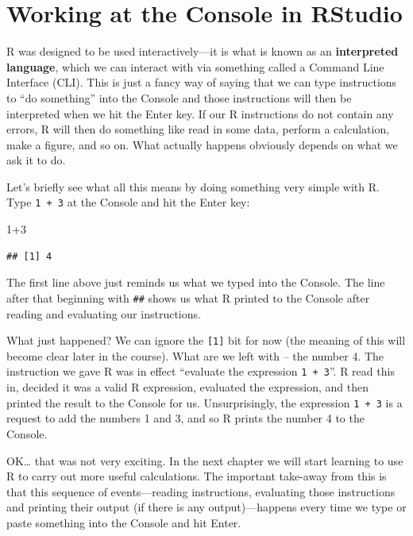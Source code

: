 \documentclass[
]{book}
\newenvironment{Shaded}{\begin{snugshade}}{\end{snugshade}}
\newcommand{\DecValTok}[1]{\textcolor[rgb]{0.00,0.00,0.81}{#1}}
\newcommand{\SpecialCharTok}[1]{\textcolor[rgb]{0.00,0.00,0.00}{#1}}
\begin{document}
\hypertarget{working-at-console}{%
\section*{Working at the Console in RStudio}\label{working-at-console}}

R was designed to be used interactively---it is what is known as an \textbf{interpreted language}, which we can interact with via something called a Command Line Interface (CLI). This is just a fancy way of saying that we can type instructions to ``do something'' into the Console and those instructions will then be interpreted when we hit the Enter key. If our R instructions do not contain any errors, R will then do something like read in some data, perform a calculation, make a figure, and so on. What actually happens obviously depends on what we ask it to do.

Let's briefly see what all this means by doing something very simple with R. Type \texttt{1\ +\ 3} at the Console and hit the Enter key:

\begin{Shaded}
\begin{Highlighting}[]
\DecValTok{1}\SpecialCharTok{+}\DecValTok{3}
\end{Highlighting}
\end{Shaded}

\begin{verbatim}
## [1] 4
\end{verbatim}

The first line above just reminds us what we typed into the Console. The line after that beginning with \texttt{\#\#} shows us what R printed to the Console after reading and evaluating our instructions.

What just happened? We can ignore the \texttt{{[}1{]}} bit for now (the meaning of this will become clear later in the course). What are we left with -- the number 4. The instruction we gave R was in effect ``evaluate the expression \texttt{1\ +\ 3}''. R read this in, decided it was a valid R expression, evaluated the expression, and then printed the result to the Console for us. Unsurprisingly, the expression \texttt{1\ +\ 3} is a request to add the numbers 1 and 3, and so R prints the number 4 to the Console.

OK\ldots{} that was not very exciting. In the next chapter we will start learning to use R to carry out more useful calculations. The important take-away from this is that this sequence of events---reading instructions, evaluating those instructions and printing their output (if there is any output)---happens every time we type or paste something into the Console and hit Enter.
\end{document}
